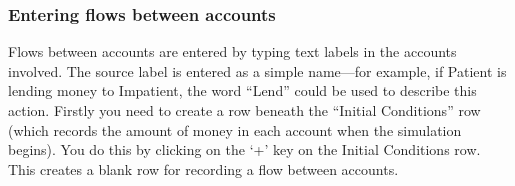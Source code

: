 
\subsubsection{Entering flows between accounts}

Flows between accounts are entered by typing text labels in the accounts
involved. The source label is entered as a simple name---for example,
if Patient is lending money to Impatient, the word ``Lend'' could
be used to describe this action. Firstly you need to create a row
beneath the ``Initial Conditions'' row (which records the amount
of money in each account when the simulation begins). You do this
by clicking on the `+' key on the Initial Conditions row. This creates
a blank row for recording a flow between accounts.

